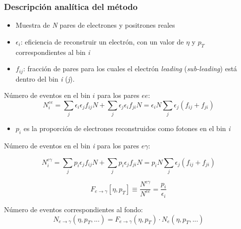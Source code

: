 \documentclass[10pt, compress,spanish]{beamer}
\begin{document}
\begin{frame}[fragile]
\frametitle{Descripción analítica del método}

\footnotesize


\begin{itemize}

\item Muestra de \textit{N} pares de electrones y positrones reales

\item $\epsilon_{i}$: eficiencia de reconstruir un electrón, con un valor de $\eta$ y $p_{T}$ correspondientes al bin \textit{i}

\item $f_{ij}$: fracción de pares para los cuales el electrón \textit{leading} (\textit{sub-leading}) está dentro del bin \textit{i} (\textit{j}).

\end{itemize}

Número de eventos en el bin $i$ para los pares $ee$:
\begin{equation*}
N_{i}^{ee} = \sum_{j}\epsilon_{i}\epsilon_{j}f_{ij}N + \sum_{j}\epsilon_{j}\epsilon_{i}f_{ji}N = \epsilon_{i}N\sum_{j}\epsilon_{j}(f_{ij}+f_{ji})
\end{equation*}


\begin{itemize}

\item $p_{i}$ es la proporción de electrones reconstruidos como fotones en el bin \textit{i}

\end{itemize}


Número de eventos en el bin \textit{i} para los pares $e\gamma$:

\begin{equation*}
N_{i}^{e\gamma} = \sum_{j}p_{i}\epsilon_{j}f_{ij}N + \sum_{j}p_{i}\epsilon_{j}f_{ji}N = p_{i}N\sum_{j}\epsilon_{j}(f_{ij}+f_{ji})
\end{equation*}

\begin{equation*}
F_{e\rightarrow\gamma}[\eta , p_{T}]\equiv\frac{N^{e\gamma}}{N^{ee}}=\frac{p_{i}}{\epsilon_{i}}
\end{equation*}


\begin{block}{Número de eventos correspondientes al fondo:}
\begin{equation*}
N_{e\rightarrow\gamma}(\eta , p_{T} , ... ) = F_{e\rightarrow\gamma}(\eta , p_{T})\cdot N_{e}(\eta , p_{T} , ...)
\end{equation*}
\end{block}

\end{frame}
\end{document}
